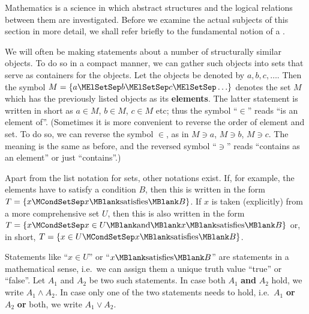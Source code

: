 \begin{MIntro}

Mathematics is a science in which abstract structures and the logical relations between them are investigated. 
Before we examine the actual subjects of this section in more detail, we shall refer briefly to the fundamental 
notion of a . 

\begin{MInfo}
We will often be making statements about a number of structurally similar objects.
To do so in a compact manner, we can gather such objects into sets that serve as
containers for the objects. Let the objects be denoted by $a,b,c,\ldots$. 
Then the symbol $M=\{a\MElSetSep b \MElSetSep c \MElSetSep \ldots\}$ denotes the set $M$ which has the previously 
listed objects as its \textbf{elements}. The latter statement is written in short as $a\in M$, $b\in M$, $c\in M$ etc; thus the symbol 
``$\in$'' reads ``is an element of''. (Sometimes it is more convenient to reverse the order of element 
and set. To do so, we can reverse the symbol $\in$, as in $M\ni a$, $M\ni b$, $M\ni c$. The meaning is
the same as before, and the reversed symbol ``$\ni$'' reads ``contains as an element'' or just
``contains''.) 

Apart from the list notation for sets, other notations exist. If, for example, the elements have to satisfy a 
condition $B$, then this is written in the form $T=\{x\MCondSetSep x\MBlank\text{satisfies}\MBlank B\}$. If $x$ is taken (explicitly) from a 
more comprehensive set $U$, then this is also written in the form $T=\{x\MCondSetSep x\in U \MBlank\text{and}\MBlank 
x\MBlank\text{satisfies}\MBlank B\}$ or, in short, $T=\{x\in U\MCondSetSep x\MBlank\text{satisfies}\MBlank B\}$.

Statements like ``$x\in U$'' or ``$x\MBlank\text{satisfies}\MBlank B$'' are statements in a 
mathematical sense, i.e.\ we can assign them a unique truth value ``true'' or ``false''. 
Let $A_1$ and $A_2$ be two such statements. In case both $A_1$ \textbf{and} $A_2$ hold, we write $A_1 \wedge A_2$. In case only one of the two 
statements needs to hold, i.e.\ $A_1$ \textbf{or} $A_2$ \textbf{or} both, we write $A_1\vee A_2$.


\end{MInfo}
\end{MIntro}
